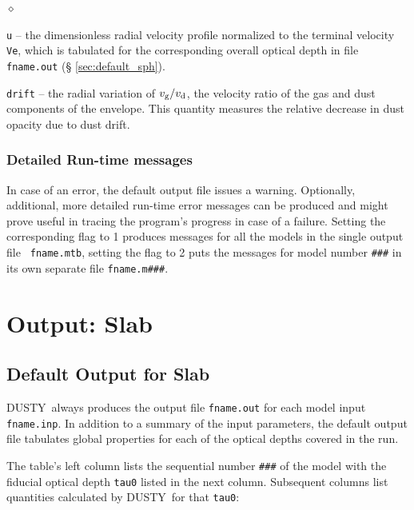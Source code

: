 \documentclass[11pt]{article}
\def\D    {{\sf DUSTY}}
\begin{document}
\begin{list}{$\diamond$}{}
\item {\tt u} -- the dimensionless radial velocity profile normalized
  to the terminal velocity {\tt Ve}, which is tabulated for the
  corresponding overall optical depth in file {\tt fname.out} (\S
  \ref{sec:default_sph}).
\item {\tt drift} -- the radial variation of $v_{\rm g}/v_{\rm d}$,
  the velocity ratio of the gas and dust components of the envelope.
  This quantity measures the relative decrease in dust opacity due to
  dust drift.

\end{list}

\subsubsection{Detailed Run-time messages}
\label{sec:error_sph}

In case of an error, the default output file issues a
warning. Optionally, additional, more detailed run-time error messages
can be produced and might prove useful in tracing the program's
progress in case of a failure. Setting the corresponding flag to 1
produces messages for all the models in the single output file {\tt
  fname.mtb}, setting the flag to 2 puts the messages for model number
{\tt \#\#\#} in its own separate file {\tt fname.m\#\#\#}.


\section{Output: Slab}
\label{sec:output_slb}

\subsection{Default Output for Slab}
\label{sec:default_slb}

\D\ always produces the output file {\tt fname.out} for each model
input {\tt fname.inp}. In addition to a summary of the input
parameters, the default output file tabulates global properties for
each of the optical depths covered in the run.

The table's left column lists the sequential number {\tt \#\#\#} of
the model with the fiducial optical depth {\tt tau0} listed in the
next column.  Subsequent columns list quantities calculated by \D\ for
that {\tt tau0}:
\end{document}

